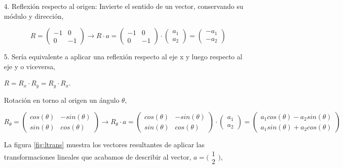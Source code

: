 \begin{paracol}{2}
4. Reflexión respecto al origen: Invierte el sentido de un vector, conservando su módulo y dirección,
\end{paracol}
\begin{equation*}
R=\begin{pmatrix}
-1& 0\\
0& -1
\end{pmatrix} \rightarrow R\cdot a = \begin{pmatrix}
-1& 0\\
0& -1
\end{pmatrix} \cdot \begin{pmatrix}
a_1\\
a_2
\end{pmatrix}= \begin{pmatrix}
-a_1\\
-a_2
\end{pmatrix}
\end{equation*}
\begin{paracol}{2}
5. Sería equivalente a aplicar una reflexión respecto al eje x y luego respecto al eje y o viceversa,
\end{paracol}
$R=R_x\cdot R_y= R_y\cdot R_x$.
\begin{paracol}{2}
 Rotación en torno al origen un ángulo $\theta$,
\end{paracol}
\begin{equation*}
R_{\theta}=\begin{pmatrix}
cos(\theta)& -sin(\theta)\\
sin(\theta)& cos(\theta)
\end{pmatrix} \rightarrow R_{\theta}\cdot a = \begin{pmatrix}
cos(\theta)& -sin(\theta)\\
sin(\theta)& cos(\theta)
\end{pmatrix} \cdot \begin{pmatrix}
a_1\\
a_2
\end{pmatrix}= \begin{pmatrix}
a_1cos(\theta)-a_2sin(\theta)\\
a_1sin(\theta)+a_2cos(\theta)
\end{pmatrix}
\end{equation*}


La figura \ref{fig:ltrans} muestra los vectores resultantes de aplicar las transformaciones lineales que acabamos de describir al vector,  $ a=\bigl( \begin{smallmatrix}
1\\
2
\end{smallmatrix} \bigr)$,

